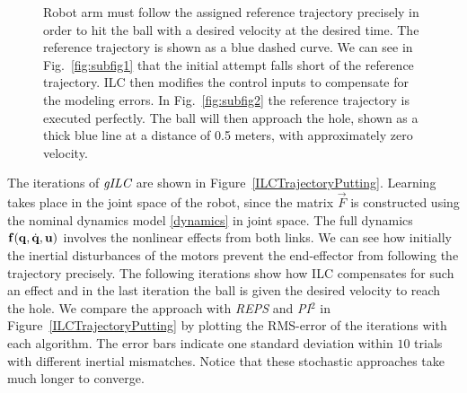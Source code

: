 \begin{figure}[ht]
\centering
{}
\caption{Robot arm must follow the assigned reference trajectory precisely in order to hit the ball with a desired velocity at the desired time. The reference trajectory is shown as a blue dashed curve. We can see in Fig.~\ref{fig:subfig1} that the initial attempt falls short of the reference trajectory. ILC then modifies the control inputs to compensate for the modeling errors. In Fig.~\ref{fig:subfig2} the reference trajectory is executed perfectly. The ball will then approach the hole, shown as a thick blue line at a distance of 0.5 meters, with approximately zero velocity.} 
\label{putting1} 
\end{figure}

The iterations of $\emph{gILC}$ are shown in Figure~\ref{ILCTrajectoryPutting}. Learning takes place in the joint space of the robot, since the matrix $\vec{F}$ is constructed using the nominal dynamics model \eqref{dynamics} in joint space. The full dynamics $\boldsymbol{\mathrm{f}}(\boldsymbol{\mathrm{q}},\dot{\boldsymbol{\mathrm{q}}},\boldsymbol{\mathrm{u}})$ involves the nonlinear effects from both links. We can see how initially the inertial disturbances of the motors prevent the end-effector from following the trajectory precisely. The following iterations show how ILC compensates for such an effect and in the last iteration the ball is given the desired velocity to reach the hole. We compare the approach with \emph{REPS} and \emph{PI$^{2}$} in Figure~\ref{ILCTrajectoryPutting} by plotting the RMS-error of the iterations with each algorithm. The error bars indicate one standard deviation within $10$ trials with different inertial mismatches. Notice that these stochastic approaches take much longer to converge.

